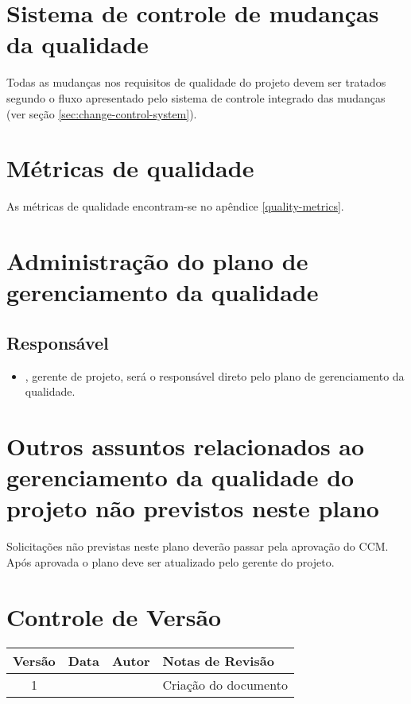 \section{Sistema de controle de mudanças da qualidade}

Todas as mudanças nos requisitos de qualidade do projeto devem ser tratados segundo o fluxo apresentado pelo sistema de controle integrado das mudanças (ver seção \ref{sec:change-control-system}).

\section{Métricas de qualidade}


As métricas de qualidade encontram-se no apêndice \ref{quality-metrics}.

\section{Administração do plano de gerenciamento da qualidade}

\subsection{Responsável}

\begin{itemize}
	\item \projectManagerName{}, gerente de projeto, será o responsável direto pelo plano de gerenciamento da qualidade.
\end{itemize}

\section{Outros assuntos relacionados ao gerenciamento da qualidade do projeto não previstos neste plano}

Solicitações não previstas neste plano deverão passar pela aprovação do CCM. Após aprovada o plano deve ser atualizado pelo gerente do projeto.

\section{Controle de Versão}

\begin{table}[H]
	\begin{tabularx}{\textwidth}{| c | c | X | X |}
		\hline
		\textbf{Versão} & \textbf{Data} & \textbf{Autor}      & \textbf{Notas de Revisão} \\
		\hline
		1                &               & \projectManagerName{} & Criação do documento     \\
		\hline
	\end{tabularx}
	\centering
\end{table}

